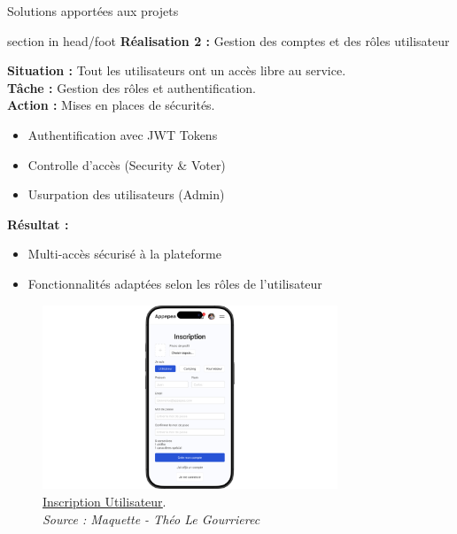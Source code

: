 \documentclass{beamer}
\begin{document}
\begin{frame}{Solutions apportées aux projets}
	\begin{beamercolorbox}[wd=\paperwidth,ht=1.5em,dp=0.5em,leftskip=0.5cm]{section in head/foot}
  		\large \textbf{Réalisation 2 :} \normalsize Gestion des comptes et des rôles utilisateur
	\end{beamercolorbox}
	\vspace{0.5em}
	\begin{center}
		 {
  			\begin{minipage}{0.9\textwidth}
  				\textbf{Situation :} Tout les utilisateurs ont un accès libre au service.\\
  				\textbf{Tâche :} Gestion des rôles et authentification.\\
  				\textbf{Action :} Mises en places de sécurités.
  				\begin{itemize}
  					\item Authentification avec JWT Tokens
  					\item Controlle d'accès (Security \& Voter)
  					\item Usurpation des utilisateurs (Admin)
  					\end{itemize}
				\textbf{Résultat :}
				\begin{itemize}
					\item Multi-accès sécurisé à la plateforme
					\item Fonctionnalités adaptées selon les rôles de l'utilisateur
				\end{itemize}
	  		\end{minipage}
  		}
  		
  		\only<2> {
			\begin{figure}[t]
  				\includegraphics[height=5.5cm]{../img/maquette/inscription.png}
				\caption{	
					\centering			
  					\href{https://github.com/Matteo-K/Soutenance_E-delic/blob/main/img/maquette/inscription.png}{\underline{Inscription Utilisateur}}.\\
  					\textit{Source : Maquette - Théo Le Gourrierec}
				}
  				\label{fig:inscription}
  			\end{figure}
		}
		

\end{center}
\end{frame}
\end{document}
